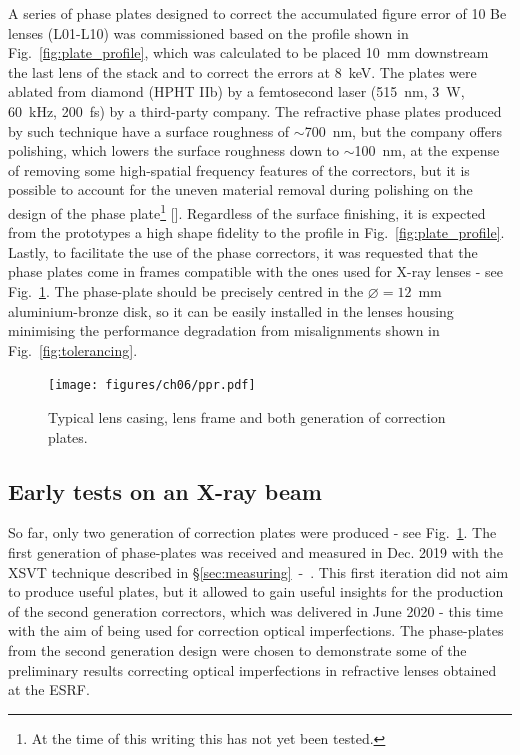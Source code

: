 \begin{refsection}
A series of phase plates designed to correct the accumulated figure error of 10 Be lenses (L01-L10) was commissioned based on the profile shown in Fig.~\ref{fig:plate_profile}, which was calculated to be placed 10~mm downstream the last lens of the stack and to correct the errors at 8~keV. The plates were ablated from diamond (HPHT IIb) by a femtosecond laser (515~nm, 3~W, 60~kHz, 200~fs) by a third-party company. The refractive phase plates produced by such technique have a surface roughness of $\sim$700~nm, but the company offers polishing, which lowers the surface roughness down to $\sim$100~nm, at the expense of removing some high-spatial frequency features of the correctors, but it is possible to account for the uneven material removal during polishing on the design of the phase plate\footnote{At the time of this writing this has not yet been tested.} [\cite{Antipov2020}]. Regardless of the surface finishing, it is expected from the prototypes a high shape fidelity to the profile in Fig.~\ref{fig:plate_profile}. Lastly, to facilitate the use of the phase correctors, it was requested that the phase plates come in frames compatible with the ones used for X-ray lenses - see Fig.~\ref{fig:potpourri}. The phase-plate should be precisely centred in the $\diameter=12$~mm aluminium-bronze disk, so it can be easily installed in the lenses housing minimising the performance degradation from misalignments shown in Fig.~\ref{fig:tolerancing}.

\begin{figure}[t]
        \centering
        {\texttt{[image: figures/ch06/ppr.pdf]}}
        \caption[Lens casing, frame and correction plates]{Typical lens casing, lens frame and both generation of correction plates. }\label{fig:potpourri}
\end{figure}
\subsection{Early tests on an X-ray beam}\label{sec:prototype_testing}

So far, only two generation of correction plates were produced - see Fig.~\ref{fig:potpourri}. The first generation of phase-plates was received and measured in Dec. 2019 with the XSVT technique described in \S\ref{sec:measuring}~-~\textit{}. This first iteration did not aim to produce useful plates, but it allowed to gain useful insights for the production of the second generation correctors, which was delivered in June 2020 - this time with the aim of being used for correction optical imperfections. The phase-plates from the second generation design were chosen to demonstrate some of the preliminary results correcting optical imperfections in refractive lenses obtained at the ESRF.


\end{refsection}
